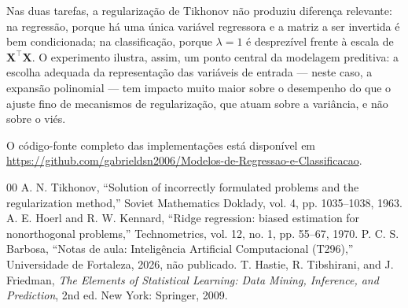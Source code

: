 \documentclass[conference]{IEEEtran}
\begin{document}
Nas duas tarefas, a regularização de Tikhonov não produziu diferença relevante:
na regressão, porque há uma única variável regressora e a matriz a ser
invertida é bem condicionada; na classificação, porque $\lambda = 1$ é
desprezível frente à escala de $\mathbf{X}^{\top}\mathbf{X}$. O experimento
ilustra, assim, um ponto central da modelagem preditiva: a escolha adequada da
representação das variáveis de entrada --- neste caso, a expansão polinomial
--- tem impacto muito maior sobre o desempenho do que o ajuste fino de
mecanismos de regularização, que atuam sobre a variância, e não sobre o viés.

O código-fonte completo das implementações está disponível em
\url{https://github.com/gabrieldsn2006/Modelos-de-Regressao-e-Classificacao}.

\begin{thebibliography}{00}
 A. N. Tikhonov, ``Solution of incorrectly formulated problems and the regularization method,'' Soviet Mathematics Doklady, vol. 4, pp. 1035--1038, 1963.
 A. E. Hoerl and R. W. Kennard, ``Ridge regression: biased estimation for nonorthogonal problems,'' Technometrics, vol. 12, no. 1, pp. 55--67, 1970.
 P. C. S. Barbosa, ``Notas de aula: Inteligência Artificial Computacional (T296),'' Universidade de Fortaleza, 2026, não publicado.
 T. Hastie, R. Tibshirani, and J. Friedman, \textit{The Elements of Statistical Learning: Data Mining, Inference, and Prediction}, 2nd ed. New York: Springer, 2009.
\end{thebibliography}
\end{document}
